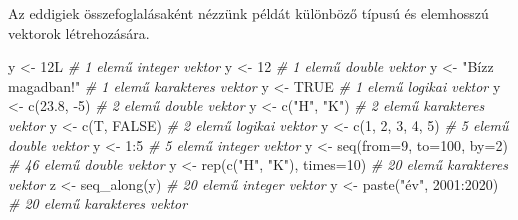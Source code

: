 \documentclass[
]{book}
\newenvironment{Shaded}{\begin{snugshade}}{\end{snugshade}}
\newcommand{\AttributeTok}[1]{\textcolor[rgb]{0.77,0.63,0.00}{#1}}
\newcommand{\CommentTok}[1]{\textcolor[rgb]{0.56,0.35,0.01}{\textit{#1}}}
\newcommand{\ConstantTok}[1]{\textcolor[rgb]{0.00,0.00,0.00}{#1}}
\newcommand{\DecValTok}[1]{\textcolor[rgb]{0.00,0.00,0.81}{#1}}
\newcommand{\FloatTok}[1]{\textcolor[rgb]{0.00,0.00,0.81}{#1}}
\newcommand{\FunctionTok}[1]{\textcolor[rgb]{0.00,0.00,0.00}{#1}}
\newcommand{\NormalTok}[1]{#1}
\newcommand{\OtherTok}[1]{\textcolor[rgb]{0.56,0.35,0.01}{#1}}
\newcommand{\SpecialCharTok}[1]{\textcolor[rgb]{0.00,0.00,0.00}{#1}}
\newcommand{\StringTok}[1]{\textcolor[rgb]{0.31,0.60,0.02}{#1}}
\begin{document}
Az eddigiek összefoglalásaként nézzünk példát különböző típusú és elemhosszú vektorok létrehozására.

\begin{Shaded}
\begin{Highlighting}[]
\NormalTok{y }\OtherTok{\textless{}{-}}\NormalTok{ 12L                        }\CommentTok{\# 1 elemű integer vektor}
\NormalTok{y }\OtherTok{\textless{}{-}} \DecValTok{12}                         \CommentTok{\# 1 elemű double vektor}
\NormalTok{y }\OtherTok{\textless{}{-}} \StringTok{"Bízz magadban!"}           \CommentTok{\# 1 elemű karakteres vektor}
\NormalTok{y }\OtherTok{\textless{}{-}} \ConstantTok{TRUE}                       \CommentTok{\# 1 elemű logikai vektor}
\NormalTok{y }\OtherTok{\textless{}{-}} \FunctionTok{c}\NormalTok{(}\FloatTok{23.8}\NormalTok{, }\SpecialCharTok{{-}}\DecValTok{5}\NormalTok{)                }\CommentTok{\# 2 elemű double vektor}
\NormalTok{y }\OtherTok{\textless{}{-}} \FunctionTok{c}\NormalTok{(}\StringTok{"H"}\NormalTok{, }\StringTok{"K"}\NormalTok{)                }\CommentTok{\# 2 elemű karakteres vektor}
\NormalTok{y }\OtherTok{\textless{}{-}} \FunctionTok{c}\NormalTok{(T, }\ConstantTok{FALSE}\NormalTok{)                }\CommentTok{\# 2 elemű logikai vektor}
\NormalTok{y }\OtherTok{\textless{}{-}} \FunctionTok{c}\NormalTok{(}\DecValTok{1}\NormalTok{, }\DecValTok{2}\NormalTok{, }\DecValTok{3}\NormalTok{, }\DecValTok{4}\NormalTok{, }\DecValTok{5}\NormalTok{)           }\CommentTok{\# 5 elemű double vektor}
\NormalTok{y }\OtherTok{\textless{}{-}} \DecValTok{1}\SpecialCharTok{:}\DecValTok{5}                        \CommentTok{\# 5 elemű integer vektor}
\NormalTok{y }\OtherTok{\textless{}{-}} \FunctionTok{seq}\NormalTok{(}\AttributeTok{from=}\DecValTok{9}\NormalTok{, }\AttributeTok{to=}\DecValTok{100}\NormalTok{, }\AttributeTok{by=}\DecValTok{2}\NormalTok{)  }\CommentTok{\# 46 elemű double vektor}
\NormalTok{y }\OtherTok{\textless{}{-}} \FunctionTok{rep}\NormalTok{(}\FunctionTok{c}\NormalTok{(}\StringTok{"H"}\NormalTok{, }\StringTok{"K"}\NormalTok{), }\AttributeTok{times=}\DecValTok{10}\NormalTok{) }\CommentTok{\# 20 elemű karakteres vektor}
\NormalTok{z }\OtherTok{\textless{}{-}} \FunctionTok{seq\_along}\NormalTok{(y)               }\CommentTok{\# 20 elemű integer vektor}
\NormalTok{y }\OtherTok{\textless{}{-}} \FunctionTok{paste}\NormalTok{(}\StringTok{"év"}\NormalTok{, }\DecValTok{2001}\SpecialCharTok{:}\DecValTok{2020}\NormalTok{)     }\CommentTok{\# 20 elemű karakteres vektor}
\end{Highlighting}
\end{Shaded}
\end{document}
